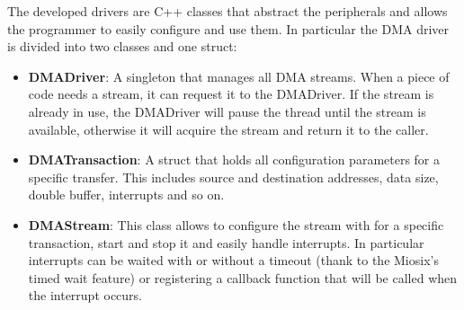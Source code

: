 The developed drivers are C++ classes that abstract the peripherals and allows the programmer to easily configure and use them. In particular the DMA driver is divided into two classes and one struct:
\begin{itemize}
      \item \textbf{DMADriver}: A singleton that manages all DMA streams. When a piece of code needs a stream, it can request it to the DMADriver. If the stream is already in use, the DMADriver will pause the thread until the stream is available, otherwise it will acquire the stream and return it to the caller.
      \item \textbf{DMATransaction}: A struct that holds all configuration parameters for a specific transfer. This includes source and destination addresses, data size, double buffer, interrupts and so on.
      \item \textbf{DMAStream}: This class allows to configure the stream with for a specific transaction, start and stop it and easily handle interrupts. In particular interrupts can be waited with or without a timeout (thank to the Miosix's timed wait feature) or registering a callback function that will be called when the interrupt occurs.
\end{itemize}
